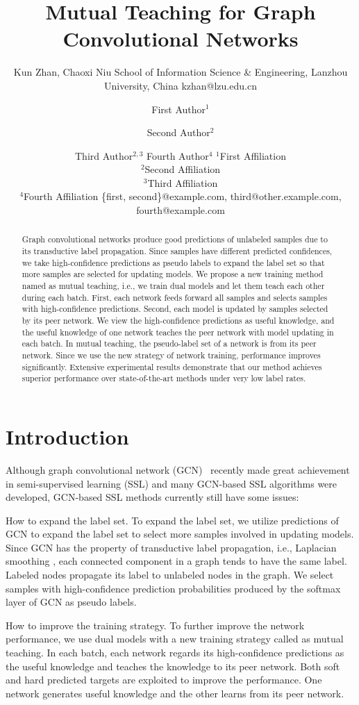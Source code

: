\documentclass{article}
\title{Mutual Teaching for Graph Convolutional Networks}
\author{
Kun Zhan, Chaoxi Niu
    \affiliations
    School of Information Science \& Engineering, Lanzhou University, China
    \emails
    kzhan@lzu.edu.cn
}
\author{
First Author$^1$
\and
Second Author$^2$\and
Third Author$^{2,3}$\And
Fourth Author$^4$
\affiliations
$^1$First Affiliation\\
$^2$Second Affiliation\\
$^3$Third Affiliation\\
$^4$Fourth Affiliation
\emails
\{first, second\}@example.com,
third@other.example.com,
fourth@example.com
}
\begin{document}
\maketitle
\begin{abstract}
Graph convolutional networks produce good predictions of unlabeled samples due to its transductive label propagation. Since samples have different predicted confidences, we take high-confidence predictions as pseudo labels to expand the label set so that more samples are selected for updating models. We propose a new training method named as mutual teaching, i.e., we train dual models and let them teach each other during each batch. First, each network feeds forward all samples and selects samples with high-confidence predictions. Second, each model is updated by samples selected by its peer network. We view the high-confidence predictions as useful knowledge, and the useful knowledge of one network teaches the peer network with model updating in each batch. In mutual teaching, the pseudo-label set of a network is from its peer network. Since we use the new strategy of network training, performance improves significantly. Extensive experimental results demonstrate that our method achieves superior performance over state-of-the-art methods under very low label rates.
\end{abstract}


\section{Introduction}
Although graph convolutional network (GCN)~\cite{kipf2016semi} recently made great achievement in semi-supervised learning (SSL) and many GCN-based SSL algorithms were developed, GCN-based SSL methods currently still have some issues:

How to expand the label set. To expand the label set, we utilize predictions of GCN to expand the label set to select more samples involved in updating models. Since GCN has the property of transductive label propagation, i.e., Laplacian smoothing \cite{li2018deeper}, each connected component in a graph tends to have the same label. Labeled nodes propagate its label to unlabeled nodes in the graph. We select samples with high-confidence prediction probabilities produced by the {\rm softmax} layer of GCN as pseudo labels.

How to improve the training strategy. To further improve the network performance, we use dual models with a new training strategy called as mutual teaching. In each batch, each network regards its high-confidence predictions as the useful knowledge and teaches the knowledge to its peer network. Both soft and hard predicted targets are exploited to improve the performance. One network generates useful knowledge and the other learns from its peer network.
\end{document}
